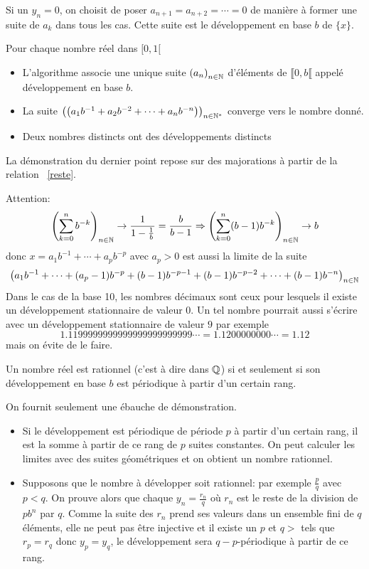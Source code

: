 Si un $y_n = 0$, on choisit de poser $a_{n+1} = a_{n+2} = \cdots = 0$ de manière à former une suite de $a_k$ dans tous les cas. Cette suite est le développement en base $b$ de $\{x\}$.

Pour chaque nombre réel dans $[0,1[$
\begin{itemize}
  \item L'algorithme associe une unique suite $\left( a_n\right)_{n\in \mathbb{N}}$ d'éléments de $\llbracket 0, b\llbracket$ appelé développement en base $b$.
  \item La suite  $\left( \left( a_1b^{-1} + a_2b^{-2} + \cdots + a_nb^{-n}\right)\right)_{n\in \mathbb{N}^*}$ converge vers le nombre donné.
  \item Deux nombres distincts ont des développements distincts
\end{itemize}
La démonstration du dernier point repose sur des majorations à partir de la relation ~\eqref{reste}.

Attention:
\begin{displaymath}
  \left( \sum_{k=0}^n b^{-k} \right)_{n\in \mathbb{N}} \rightarrow \frac{1}{1-\frac{1}{b}} = \frac{b}{b-1}
  \Rightarrow 
  \left( \sum_{k=0}^n (b-1)b^{-k} \right)_{n\in \mathbb{N}} \rightarrow  b
\end{displaymath}
donc $x = a_1b^{-1} + \cdots + a_pb^{-p}$ avec $a_p>0$ est aussi la limite de la suite
\begin{displaymath}
    \left( a_1b^{-1} + \cdots +(a_p-1)b^{-p} + (b-1)b^{-p-1}+ (b-1)b^{-p-2} + \cdots +(b-1)b^{-n}\right)_{n\in \mathbb{N}} 
\end{displaymath}
Dans le cas de la base 10, les nombres décimaux sont ceux pour lesquels il existe un développement stationnaire de valeur $0$. Un tel nombre pourrait aussi s'écrire avec un développement stationnaire de valeur $9$ par exemple 
\begin{displaymath}
 1.1199999999999999999999999\cdots = 1.1200000000\cdots = 1.12
\end{displaymath}
mais on évite de le faire.
\begin{prop}
  Un nombre réel est rationnel (c'est à dire dans $\mathbb{Q}$) si et seulement si son développement en base $b$ est périodique à partir d'un certain rang.
\end{prop}
\begin{demo}
On fournit seulement une ébauche de démonstration.
\begin{itemize}
  \item Si le développement est périodique de période $p$ à partir d'un certain rang, il est la somme à partir de ce rang de $p$ suites constantes. On peut calculer les limites avec des suites géométriques et on obtient un nombre rationnel.
  \item Supposons que le nombre à développer soit rationnel: par exemple $\frac{p}{q}$ avec $p<q$.  On prouve alors que chaque $y_n=\frac{r_n}{q}$ où $r_n$ est le reste de la division de $pb^n$ par $q$. Comme la suite des $r_n$ prend ses valeurs dans un ensemble fini de $q$ éléments, elle ne peut pas être injective et il existe un $p$ et $q>$ tels que $r_p = r_q$ donc $y_p = y_q$, le développement sera $q-p$-périodique à partir de ce rang.
\end{itemize}
\end{demo}

\printindex

 